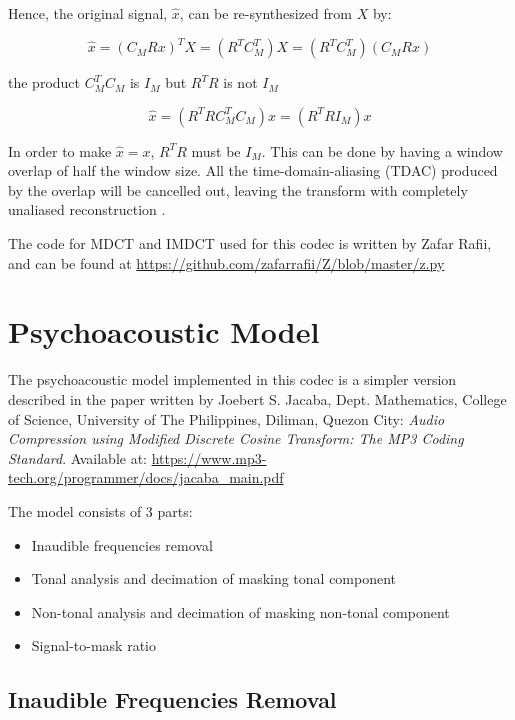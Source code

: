 \documentclass[conference]{IEEEtran}
\begin{document}
	Hence, the original signal, $\hat{x}$, can be re-synthesized from $X$ by:
	
	\begin{equation}
	\hat{x}=(C_MRx)^TX = (R^TC_M^T)X = (R^TC_M^T)(C_MRx)
	\label{eq6}
	\end{equation}
	
	the product $C_M^TC_M$ is $I_M$ but $R^TR$ is not $I_M$
	
	\begin{equation}
	\hat{x}=(R^TRC_M^TC_M)x = (R^TRI_M)x
	\label{eq7}
	\end{equation}
	
	In order to make $\hat{x} = x$, $R^TR$ must be $I_M$. This can be done by having a window overlap of half the window size. All the time-domain-aliasing (TDAC) produced by the overlap will be cancelled out, leaving the transform with completely unaliased reconstruction \cite{b2}.
	
	The code for MDCT and IMDCT used for this codec is written by Zafar Rafii, and can be found at \url{https://github.com/zafarrafii/Z/blob/master/z.py}
	
	\newpage
	\section{Psychoacoustic Model}
	
	The psychoacoustic model implemented in this codec is a simpler version described in the paper \cite{b3} written by Joebert S. Jacaba, Dept. Mathematics, College of Science, University of The Philippines, Diliman, Quezon City: \textit{Audio Compression using Modified Discrete Cosine Transform: The MP3 Coding Standard}. Available at: \url{https://www.mp3-tech.org/programmer/docs/jacaba_main.pdf}
	
	The model consists of 3 parts: 
	\begin{itemize}
		\item Inaudible frequencies removal
		\item Tonal analysis and decimation of masking tonal component
		\item Non-tonal analysis and decimation of masking non-tonal component
		\item Signal-to-mask ratio
	\end{itemize}
	
	\subsection{Inaudible Frequencies Removal}
	
\end{document}
